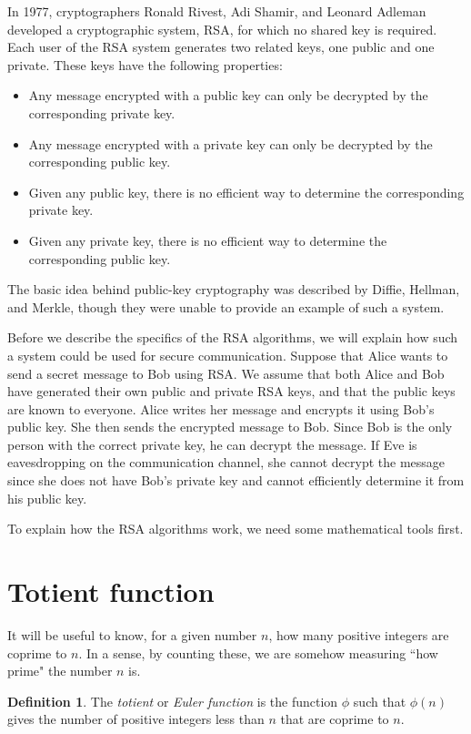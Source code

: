 \documentclass{book}
\theoremstyle{plain}
\theoremstyle{definition}
\newtheorem{definition}[theorem]{Definition}
\begin{document}
In 1977, cryptographers Ronald Rivest, Adi Shamir, and Leonard Adleman developed a cryptographic system, RSA, for which no shared key is required. Each user of the RSA system generates two related keys, one public and one private. These keys have the following properties:
\begin{itemize}
\item Any message encrypted with a public key can only be decrypted by the corresponding private key.
\item Any message encrypted with a private key can only be decrypted by the corresponding public key.
\item Given any public key, there is no efficient way to determine the corresponding private key.
\item Given any private key, there is no efficient way to determine the corresponding public key.
\end{itemize}

The basic idea behind public-key cryptography was described by Diffie, Hellman, and Merkle, though they were unable to provide an example of such a system.

Before we describe the specifics of the RSA algorithms, we will explain how such a system could be used for secure communication. Suppose that Alice wants to send a secret message to Bob using RSA. We assume that both Alice and Bob have generated their own public and private RSA keys, and that the public keys are known to everyone. Alice writes her message and encrypts it using Bob's public key. She then sends the encrypted message to Bob. Since Bob is the only person with the correct private key, he can decrypt the message. If Eve is eavesdropping on the communication channel, she cannot decrypt the message since she does not have Bob's private key and cannot efficiently determine it from his public key.

To explain how the RSA algorithms work, we need some mathematical tools first.

\section{Totient function}
It will be useful to know, for a given number $n$, how many positive integers are coprime to $n$. In a sense, by counting these, we are somehow measuring ``how prime" the number $n$ is.

\begin{definition}
The {\it totient} or {\it Euler function} is the function $\phi$ such that $\phi(n)$ gives the number of positive integers less than $n$ that are coprime to $n$.
\end{definition}
\end{document}
